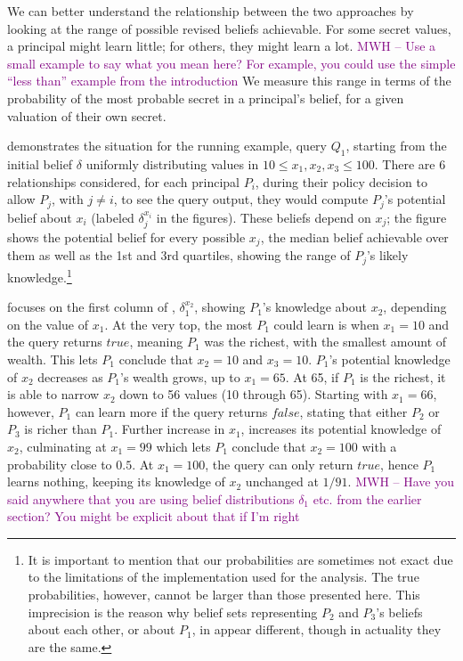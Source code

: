 \documentclass[10pt]{sigplanconf}
\newcommand{\mwh}[1]{\textcolor{purple}{MWH -- #1}}
\newcommand{\mwh}[1]{}
\begin{document}
We can better understand the relationship between the two approaches
by looking at the range of possible revised beliefs achievable. For
some secret values, a principal might learn little; for others, they
might learn a lot. \mwh{Use a small example to say what you mean here?
   For example, you could use the simple ``less than'' example from
   the introduction} We measure this range in terms of the probability
of the most probable secret in a principal's belief, for a given
valuation of their own secret.

 demonstrates the situation for the running
example, query $ Q_1 $, starting from the initial belief $\delta $
uniformly distributing values in $ 10 \leq x_1, x_2, x_3 \leq
100$. There are 6 relationships considered, for each principal $ P_i
$, during their policy decision to allow $ P_j $, with $ j \neq i $,
to see the query output, they would compute $ P_j $'s potential belief
about $ x_i $ (labeled $ \delta_j^{x_i} $ in the figures). These
beliefs depend on $ x_j $; the figure shows the potential belief for
every possible $ x_j $, the median belief achievable over them as well
as the 1st and 3rd quartiles, showing the range of $ P_j $'s likely
knowledge.\footnote{It is important to mention that our probabilities
are sometimes not exact due to the limitations of the implementation
used for the analysis. The true probabilities, however, cannot be
larger than those presented here. This imprecision is the reason why
belief sets representing $ P_2 $ and $ P_3 $'s beliefs about each
other, or about $ P_1 $, in  appear different,
though in actuality they are the same.}

 focuses on the first column of , $ \delta_1^{x_2} $, showing $ P_1 $'s
knowledge about $ x_2 $, depending on the value of $ x_1 $. At the very
top, the most $ P_1 $ could learn is when $ x_1 = 10 $ and the query
returns $ true $, meaning $ P_1 $ was the richest, with the smallest
amount of wealth. This lets $ P_1 $ conclude that $ x_2 = 10 $ and $
x_3 = 10 $. $ P_1 $'s potential knowledge of $ x_2 $ decreases as $
P_1 $'s wealth grows, up to $ x_1 = 65 $. At 65, if $ P_1 $ is the
richest, it is able to narrow $ x_2 $ down to 56 values (10 through
65). Starting with $ x_1 = 66 $, however, $ P_1 $ can learn more if
the query returns $ false $, stating that either $ P_2 $ or $ P_3 $ is
richer than $ P_1 $. Further increase in $ x_1 $, increases its
potential knowledge of $ x_2 $, culminating at $ x_1 = 99 $ which lets
$ P_1 $ conclude that $ x_2 = 100 $ with a probability close to $ 0.5
$. At $ x_1 = 100 $, the query can only return $ true $, hence $ P_1 $
learns nothing, keeping its knowledge of $ x_2 $ unchanged at $ 1/91
$. \mwh{Have you said anywhere that you are using belief distributions
  $\delta_1$ etc. from the earlier section?  You might be explicit
  about that if I'm right}
\end{document}
